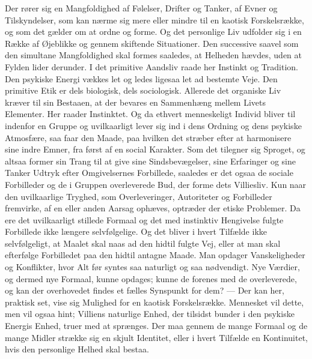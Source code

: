 \documentclass[12pt,a4paper]{book}
\newcommand{\apage}[1]{\marginnote{\footnotesize\textit{[#1]}}}
\begin{document}
Der rører sig en Mangfoldighed af Følelser, Drifter og Tanker, af Evner og Tilskyndelser,
som kan nærme sig mere eller mindre til en kaotisk Forskelsrække, og som det gælder om at
ordne og forme. Og det personlige Liv udfolder sig i en Række af Øjeblikke og gennem
skiftende Situationer. Den successive saavel som den simultane Mangfoldighed skal formes
saaledes, at Helheden hævdes, uden at Fylden lider derunder. I det primitive Aandsliv raade
her Instinkt og Tradition. Den psykiske Energi vækkes let og ledes ligesaa let ad bestemte
Veje. Den primitive Etik er dels biologisk, dels sociologisk. Allerede det organiske Liv
kræver til sin Bestaaen, at der bevares en Sammenhæng mellem Livets Elementer. Her raader
Instinktet. Og da ethvert menneskeligt Individ bliver til indenfor en Gruppe og
uvilkaarligt lever sig ind i dens Ordning og dens psykiske Atmosfære, saa faar den Maade,
paa hvilken det stræber efter at harmonisere sine indre Emner, fra først af en social
Karakter. Som det tilegner sig Sproget, og altsaa former sin Trang til at \apage{351} give sine
Sindsbevægelser, sine Erfaringer og sine Tanker Udtryk efter Omgivelsernes Forbillede,
saaledes er det ogsaa de sociale Forbilleder og de i Gruppen overleverede Bud, der forme
dets Villiesliv. Kun naar den uvilkaarlige Tryghed, som Overleveringer, Autoriteter og
Forbilleder fremvirke, af en eller anden Aarsag ophæves, optræder der etiske Problemer. Da
ere det uvilkaarligt stillede Formaal og det med instinktiv Hengivelse fulgte Forbillede
ikke længere selvfølgelige. Og det bliver i hvert Tilfælde ikke selvfølgeligt, at Maalet
skal naas ad den hidtil fulgte Vej, eller at man skal efterfølge Forbilledet paa den hidtil
antagne Maade. Man opdager Vanskeligheder og Konflikter, hvor Alt før syntes saa naturligt
og saa nødvendigt. Nye Værdier, og dermed nye Formaal, kunne opdages; kunne de forenes med
de overleverede, og kan der overhovedet findes et fælles Synspunkt for dem? --- Der kan
her, praktisk set, vise sig Mulighed for en kaotisk Forskelsrække. Mennesket vil dette, men
vil ogsaa hint; Villiens naturlige Enhed, der tilsidst bunder i den psykiske Energis Enhed,
truer med at sprænges. Der maa gennem de mange Formaal og de mange Midler strække sig en
skjult Identitet, eller i hvert Tilfælde en Kontinuitet, hvis den personlige Helhed skal
bestaa.
\end{document}
